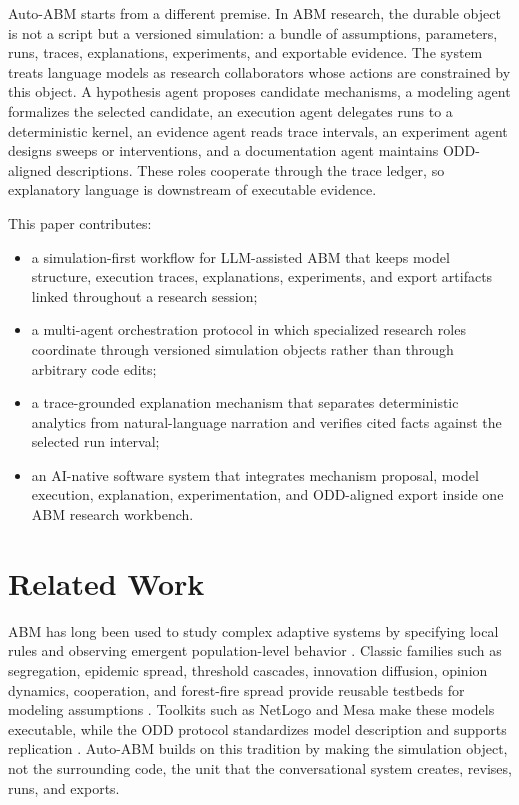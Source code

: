 \documentclass[11pt]{article}
\newcommand{\sys}{Auto-ABM}
\begin{document}
\sys{} starts from a different premise. In ABM research, the durable object is not a script but a versioned simulation: a bundle of assumptions, parameters, runs, traces, explanations, experiments, and exportable evidence. The system treats language models as research collaborators whose actions are constrained by this object. A hypothesis agent proposes candidate mechanisms, a modeling agent formalizes the selected candidate, an execution agent delegates runs to a deterministic kernel, an evidence agent reads trace intervals, an experiment agent designs sweeps or interventions, and a documentation agent maintains ODD-aligned descriptions. These roles cooperate through the trace ledger, so explanatory language is downstream of executable evidence.

This paper contributes:
\begin{itemize}[leftmargin=*]
  \item a simulation-first workflow for LLM-assisted ABM that keeps model structure, execution traces, explanations, experiments, and export artifacts linked throughout a research session;
  \item a multi-agent orchestration protocol in which specialized research roles coordinate through versioned simulation objects rather than through arbitrary code edits;
  \item a trace-grounded explanation mechanism that separates deterministic analytics from natural-language narration and verifies cited facts against the selected run interval;
  \item an AI-native software system that integrates mechanism proposal, model execution, explanation, experimentation, and ODD-aligned export inside one ABM research workbench.
\end{itemize}

\section{Related Work}

ABM has long been used to study complex adaptive systems by specifying local rules and observing emergent population-level behavior \citep{bonabeau2002abm,macal2010tutorial}. Classic families such as segregation, epidemic spread, threshold cascades, innovation diffusion, opinion dynamics, cooperation, and forest-fire spread provide reusable testbeds for modeling assumptions \citep{schelling1971segregation,kermack1927epidemics,granovetter1978threshold,bass1969new,deffuant2000mixing,nowak2006five,drossel1992forest}. Toolkits such as NetLogo \citep{wilensky1999netlogo} and Mesa \citep{kazil2020mesa,terhoeven2025mesa3} make these models executable, while the ODD protocol standardizes model description and supports replication \citep{grimm2020odd}. \sys{} builds on this tradition by making the simulation object, not the surrounding code, the unit that the conversational system creates, revises, runs, and exports.
\end{document}
